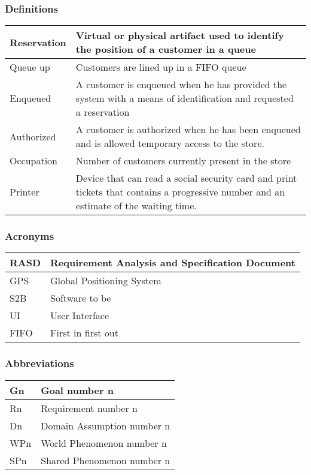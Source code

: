 \subsubsection{Definitions}
\begin{tabular}{ | m{5cm} | m{10cm} | }
	\hline
	Reservation & Virtual or physical artifact used to identify the position of a customer in a queue \\
	\hline
	Queue up & Customers are lined up in a FIFO queue\\
	\hline
	Enqueued & A customer is enqueued when he has provided the system with a means of identification and requested a reservation\\
	\hline
	Authorized & A customer is authorized when he has been enqueued and is allowed temporary access to the store.\\
	\hline
	Occupation & Number of customers currently present in the store\\
	\hline
	Printer & Device that can read a social security card and print tickets that contains a progressive number and an estimate of the waiting time.\\
	\hline
\end{tabular}
\subsubsection{Acronyms}
\begin{tabular}{ | m{5cm} | m{10cm} | }
	\hline
	RASD & Requirement Analysis and Specification Document \\
	\hline
	GPS & Global Positioning System \\
	\hline
	S2B & Software to be \\
	\hline
	UI & User Interface\\
	\hline
	FIFO & First in first out\\
	\hline
\end{tabular}
\subsubsection{Abbreviations}
\begin{tabular}{ | m{5cm} | m{10cm} | }
	\hline
	Gn & Goal number n \\
	\hline
	Rn & Requirement number n \\
	\hline
	Dn & Domain Assumption number n \\
	\hline
	WPn & World Phenomenon number n \\
	\hline
	SPn & Shared Phenomenon number n \\
	\hline
\end{tabular}
